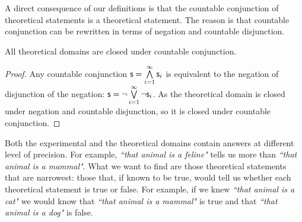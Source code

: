 \documentclass[11pt,letterpaper,fleqn]{memoir} %
\begin{document}
A direct consequence of our definitions is that the countable conjunction of theoretical statements is a theoretical statement. The reason is that countable conjunction can be rewritten in terms of negation and countable disjunction.

\begin{mathSection}
	\begin{prop}
		All theoretical domains are closed under countable conjunction.
	\end{prop}

\begin{proof}
	Any countable conjunction $\mathsf{s} = \bigwedge\limits_{i=1}^{\infty} \mathsf{s}_i$ is equivalent to the negation of disjunction of the negation: $\mathsf{s} = \neg\bigvee\limits_{i=1}^{\infty} \neg\mathsf{s}_i$. As the theoretical domain is closed under negation and countable disjunction, so it is closed under countable conjunction.  
\end{proof}

\end{mathSection}

Both the experimental and the theoretical domains contain answers at different level of precision. For example, \emph{``that animal is a feline"} tells us more than \emph{``that animal is a mammal"}. What we want to find are those theoretical statements that are narrowest: those that, if known to be true, would tell us whether each theoretical statement is true or false. For example, if we knew \emph{``that animal is a cat"} we would know that \emph{``that animal is a mammal"} is true and that \emph{``that animal is a dog"} is false.
\end{document}

